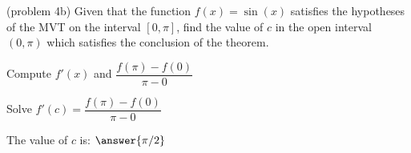 \documentclass[handout]{ximera}
\begin{document}
\begin{problem}(problem 4b)
  Given that the function $f(x) = \sin(x)$ satisfies the hypotheses of the MVT on the
	interval $[0, \pi]$, find the value of $c$ in the open interval $(0, \pi)$ which satisfies 
	the conclusion of the theorem.
	
    \begin{hint}
      Compute $f'(x)$ and $\dfrac{f(\pi) - f(0)}{\pi - 0}$
    \end{hint}
		\begin{hint}
		  Solve $f'(c) = \dfrac{f(\pi) - f(0)}{\pi - 0}$
		\end{hint}
		
		The value of $c$ is:
		 $\answer{\pi /2}$
\end{problem}

\begin{center}
\begin{foldable}
\end{foldable}
\end{center}
\end{document}
